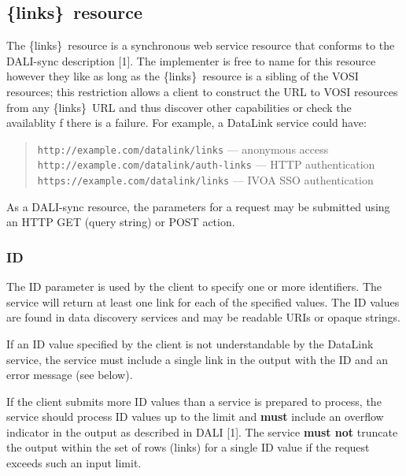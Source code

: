 \documentclass[11pt,a4paper]{ivoa}
\newcommand{\blinks}{\{links\}}
\begin{document}
\subsection{\blinks\ resource}

The \blinks\ resource is a synchronous web service resource that conforms
to the DALI-sync description [1]. The implementer is free to name for this
resource however they like as long as the \blinks\ resource is a sibling
of the VOSI resources; this restriction allows a client to construct
the URL to VOSI resources from any \blinks\ URL and thus discover other
capabilities or check the availablity f there is a failure. For example,
a DataLink service could have:
\begin{quote}
  \hspace*{-1.5em}
  {\small\nolinkurl{http://example.com/datalink/links}}
  --- anonymous access \\
  \hspace*{-1.5em}
  {\small\nolinkurl{http://example.com/datalink/auth-links}}
  --- HTTP authentication \\
  \hspace*{-1.5em}
  {\small\nolinkurl{https://example.com/datalink/links}}
  --- IVOA SSO authentication
\end{quote}

As a DALI-sync resource, the parameters for a request may be submitted
using an HTTP GET (query string) or POST action.


\subsubsection{ID}

The ID parameter is used by the client to specify one or more
identifiers. The service will return at least one link for each of the
specified values. The ID values are found in data discovery services
and may be readable URIs or opaque strings.

If an ID value specified by the client is not understandable by the
DataLink service, the service must include a single link in the output
with the ID and an error message (see below).

If the client submits more ID values than a service is prepared to
process, the service should process ID values up to the limit and
{\bf must} include an overflow indicator in the output
as described in DALI [1].
The service {\bf must not} truncate the output within the set of rows
(links) for a single ID value if the request exceeds such an input limit.
\end{document}
